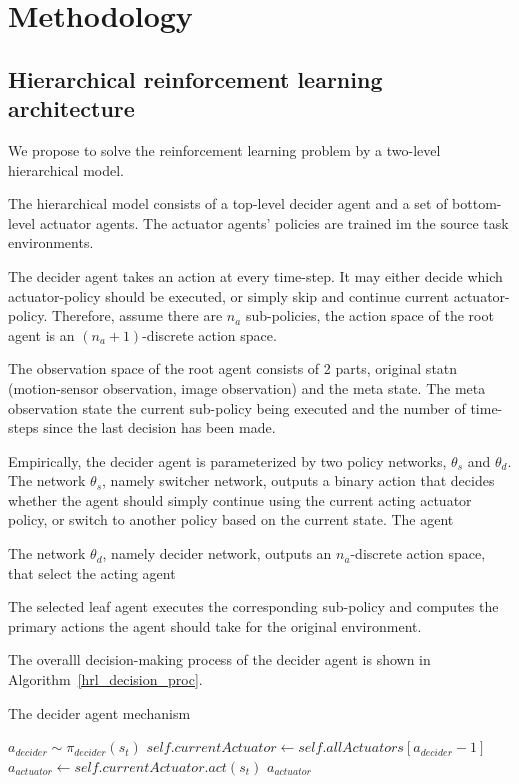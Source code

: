 \chapter{Methodology}




\section{Hierarchical reinforcement learning architecture}
We propose to solve the reinforcement learning problem by a two-level hierarchical model. 

The hierarchical model consists of a top-level decider agent and a set of bottom-level actuator agents. The actuator agents' policies are trained im the source task environments. 

The decider agent takes an action at every time-step. It may either decide which actuator-policy should be executed, or simply skip and continue current actuator-policy. Therefore, assume there are $n_a$ sub-policies, the action space of the root agent is an $(n_a+1)$-discrete action space.

The observation space of the root agent consists of 2 parts, original statn (motion-sensor observation, image observation) and the meta state. The meta observation state the current sub-policy being executed and the number of time-steps since the last decision has been made.

Empirically, the decider agent is parameterized by two policy networks, $\theta_s$ and $\theta_d$. The network $\theta_s$, namely switcher network, outputs a binary action that decides whether the agent should simply continue using the current acting actuator policy, or switch to another policy based on the current state. The agent

The network $\theta_d$, namely decider network, outputs an $n_a$-discrete action space, that select the acting agent

The selected leaf agent executes the corresponding sub-policy and computes the primary actions the agent should take for the original environment.

 The overalll decision-making process of the decider agent is shown in Algorithm~\ref{hrl_decision_proc}.

\begin{algorithm}
\caption{The decider agent mechanism}\label{hrl_decision_proc}
\begin{algorithmic}%
\State $a_{decider} \sim \pi_{decider}(s_t)$
 \State $self.currentActuator \gets self.allA
ctuators[a_{decider}-1]$
 \EndIf
\State $a_{actuator} \gets self.currentActuator.act(s_t)$
\State \Return $a_{actuator}$
\EndFunction
\end{algorithmic}
\end{algorithm}


